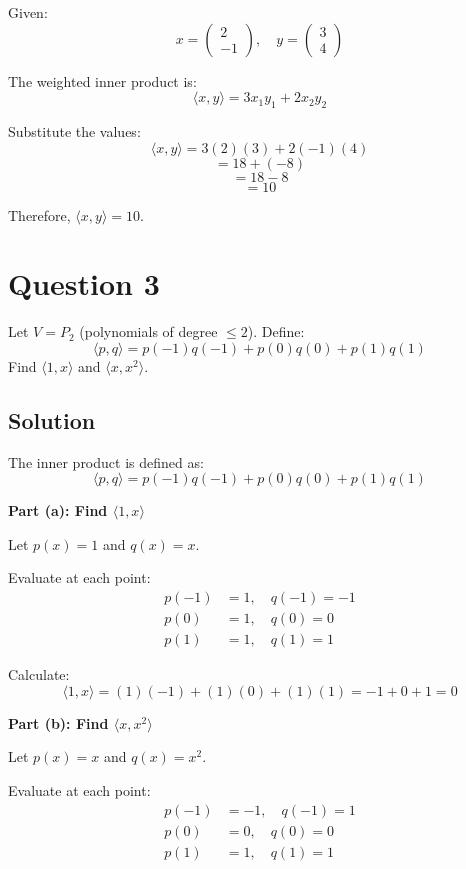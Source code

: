 \documentclass[12pt]{article}
\begin{document}
Given:
\[
x = \begin{pmatrix} 2 \\ -1 \end{pmatrix}, \quad y = \begin{pmatrix} 3 \\ 4 \end{pmatrix}
\]

The weighted inner product is:
\[
\langle x, y \rangle = 3x_1y_1 + 2x_2y_2
\]

Substitute the values:
\[
\langle x, y \rangle = 3(2)(3) + 2(-1)(4)
\]
\[
= 18 + (-8)
\]
\[
= 18 - 8
\]
\[
= 10
\]

Therefore, $\langle x, y \rangle = 10$.

\section*{Question 3}
Let $V = P_2$ (polynomials of degree $\le 2$). Define:
\[
\langle p, q \rangle = p(-1)q(-1) + p(0)q(0) + p(1)q(1)
\]
Find $\langle 1, x \rangle$ and $\langle x, x^2 \rangle$.

\subsection*{Solution}

The inner product is defined as:
\[
\langle p, q \rangle = p(-1)q(-1) + p(0)q(0) + p(1)q(1)
\]

\textbf{Part (a): Find $\langle 1, x \rangle$}

Let $p(x) = 1$ and $q(x) = x$.

Evaluate at each point:
\begin{align*}
p(-1) &= 1, \quad q(-1) = -1 \\
p(0) &= 1, \quad q(0) = 0 \\
p(1) &= 1, \quad q(1) = 1
\end{align*}

Calculate:
\[
\langle 1, x \rangle = (1)(-1) + (1)(0) + (1)(1) = -1 + 0 + 1 = 0
\]

\textbf{Part (b): Find $\langle x, x^2 \rangle$}

Let $p(x) = x$ and $q(x) = x^2$.

Evaluate at each point:
\begin{align*}
p(-1) &= -1, \quad q(-1) = 1 \\
p(0) &= 0, \quad q(0) = 0 \\
p(1) &= 1, \quad q(1) = 1
\end{align*}
\end{document}

